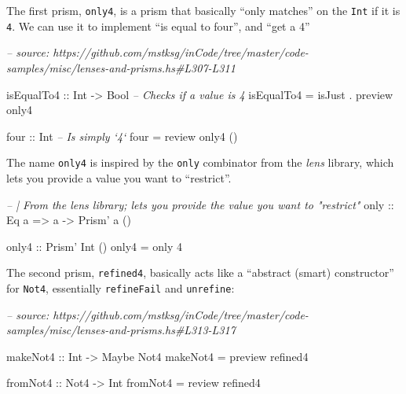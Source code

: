 \documentclass[]{article}
\newenvironment{Shaded}{}{}
\newcommand{\CommentTok}[1]{\textcolor[rgb]{0.38,0.63,0.69}{\textit{#1}}}
\newcommand{\DataTypeTok}[1]{\textcolor[rgb]{0.56,0.13,0.00}{#1}}
\newcommand{\DecValTok}[1]{\textcolor[rgb]{0.25,0.63,0.44}{#1}}
\newcommand{\FunctionTok}[1]{\textcolor[rgb]{0.02,0.16,0.49}{#1}}
\newcommand{\NormalTok}[1]{#1}
\newcommand{\OtherTok}[1]{\textcolor[rgb]{0.00,0.44,0.13}{#1}}
\begin{document}
The first prism, \texttt{only4}, is a prism that basically ``only matches'' on
the \texttt{Int} if it is \texttt{4}. We can use it to implement ``is equal to
four'', and ``get a 4''

\begin{Shaded}
\begin{Highlighting}[]
\CommentTok{-- source: https://github.com/mstksg/inCode/tree/master/code-samples/misc/lenses-and-prisms.hs#L307-L311}

\OtherTok{isEqualTo4 ::} \DataTypeTok{Int} \OtherTok{->} \DataTypeTok{Bool}   \CommentTok{-- Checks if a value is 4}
\NormalTok{isEqualTo4 }\FunctionTok{=}\NormalTok{ isJust }\FunctionTok{.}\NormalTok{ preview only4}

\OtherTok{four ::} \DataTypeTok{Int}     \CommentTok{-- Is simply `4`}
\NormalTok{four }\FunctionTok{=}\NormalTok{ review only4 ()}
\end{Highlighting}
\end{Shaded}

The name \texttt{only4} is inspired by the \texttt{only} combinator from the
\emph{lens} library, which lets you provide a value you want to ``restrict''.

\begin{Shaded}
\begin{Highlighting}[]
\CommentTok{-- | From the lens library; lets you provide the value you want to "restrict"}
\OtherTok{only ::} \DataTypeTok{Eq}\NormalTok{ a }\OtherTok{=>}\NormalTok{ a }\OtherTok{->} \DataTypeTok{Prism'}\NormalTok{ a ()}

\OtherTok{only4 ::} \DataTypeTok{Prism'} \DataTypeTok{Int}\NormalTok{ ()}
\NormalTok{only4 }\FunctionTok{=}\NormalTok{ only }\DecValTok{4}
\end{Highlighting}
\end{Shaded}

The second prism, \texttt{refined4}, basically acts like a ``abstract (smart)
constructor'' for \texttt{Not4}, essentially \texttt{refineFail} and
\texttt{unrefine}:

\begin{Shaded}
\begin{Highlighting}[]
\CommentTok{-- source: https://github.com/mstksg/inCode/tree/master/code-samples/misc/lenses-and-prisms.hs#L313-L317}

\OtherTok{makeNot4 ::} \DataTypeTok{Int} \OtherTok{->} \DataTypeTok{Maybe} \DataTypeTok{Not4}
\NormalTok{makeNot4 }\FunctionTok{=}\NormalTok{ preview refined4}

\OtherTok{fromNot4 ::} \DataTypeTok{Not4} \OtherTok{->} \DataTypeTok{Int}
\NormalTok{fromNot4 }\FunctionTok{=}\NormalTok{ review refined4}
\end{Highlighting}
\end{Shaded}
\end{document}
